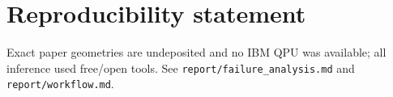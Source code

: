\documentclass[11pt]{article}
\begin{document}
\section*{Reproducibility statement}
Exact paper geometries are undeposited and no IBM QPU was available; all inference used
free/open tools. See \texttt{report/failure\_analysis.md} and \texttt{report/workflow.md}.
\end{document}
